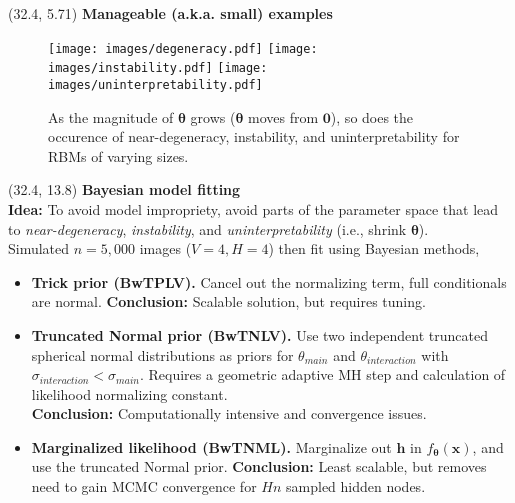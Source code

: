 \documentclass[extrafontsizes, 30pt]{memoir}
\begin{document}
\begin{textblock}{14}(32.4, 5.71)
{\large \bfseries Manageable (a.k.a. small) examples}
\begin{figure}
\centering
\texttt{[image: images/degeneracy.pdf]}
\texttt{[image: images/instability.pdf]}
\texttt{[image: images/uninterpretability.pdf]}
\label{fig:three_ways}
\caption{As the magnitude of $\boldsymbol \theta$ grows ($\boldsymbol \theta$ moves from $\boldsymbol 0$), so does the occurence of near-degeneracy, instability, and uninterpretability for RBMs of varying sizes.}
\end{figure}
\end{textblock}

\begin{textblock}{14}(32.4, 13.8)
{\large \bfseries Bayesian model fitting} \\
{\bfseries Idea:} To avoid model impropriety, avoid parts of the parameter space that lead to \emph{near-degeneracy}, \emph{instability}, and \emph{uninterpretability} (i.e., shrink $\boldsymbol \theta$). \\[-.75cm]

Simulated $n = 5,000$ images ($V = 4, H = 4$) then fit using Bayesian methods, 
\vspace{-.5cm}
\begin{itemize}
\setlength\itemsep{.05cm}
\item {\bfseries Trick prior (BwTPLV).} Cancel out the normalizing term, full conditionals are normal. {\bfseries Conclusion:} Scalable solution, but requires tuning.
\vspace{-.75cm}
\item{\bfseries Truncated Normal prior (BwTNLV).} Use two independent truncated spherical normal distributions as priors for $\theta_{main}$ and $\theta_{interaction}$ with $\sigma_{interaction} < \sigma_{main}$. Requires a geometric adaptive MH step \cite{zhou2014some} and calculation of likelihood normalizing constant. \\{\bfseries Conclusion:} Computationally intensive and convergence issues.
\item{\bfseries Marginalized likelihood (BwTNML).} Marginalize out $\boldsymbol h$ in $f_{\boldsymbol \theta}(\boldsymbol x)$, and use the truncated Normal prior. {\bfseries Conclusion:} Least scalable, but removes need to gain MCMC convergence for $Hn$ sampled hidden nodes.
\end{itemize}


\end{textblock}
\end{document}
